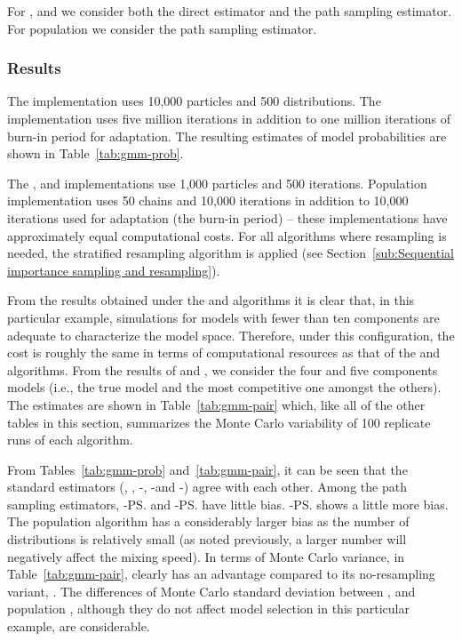 For \smc[2], \smc[3] and \ais we consider both the direct estimator and the path sampling estimator. For population \mcmc we consider the path sampling estimator.

\subsubsection{Results}
\label{sec:gmm_res}

The \smc[1] implementation uses 10,000 particles and 500 distributions. The \rjmcmc implementation uses five million iterations in addition to one million iterations of burn-in period for adaptation. The resulting estimates of model probabilities are shown in Table~\ref{tab:gmm-prob}.

The \smc[2], \smc[3] and \ais implementations use 1,000 particles and 500 iterations. Population \mcmc implementation uses 50 chains and 10,000 iterations in addition to 10,000 iterations used for adaptation (the burn-in period) -- these implementations have approximately equal computational costs. For all algorithms where resampling is needed, the stratified resampling algorithm is applied (see Section~\ref{sub:Sequential importance sampling and resampling}).

From the results obtained under the \smc[1] and \rjmcmc algorithms it is clear that, in this particular example, simulations for models with fewer than ten components are adequate to characterize the model space. Therefore, under this configuration, the cost is roughly the same in terms of computational resources as that of the \smc[1] and \rjmcmc algorithms. From the results of \rjmcmc and \smc[1], we consider the four and five components models (i.e., the true model and the most competitive one amongst the others). The estimates are shown in Table~\ref{tab:gmm-pair} which, like all of the other tables in this section, summarizes the Monte Carlo variability of 100 replicate runs of each algorithm.




From Tables~\ref{tab:gmm-prob} and~\ref{tab:gmm-pair}, it can be seen that the standard estimators (\rjmcmc, \smc[1], \smc[2]-\ds, \smc[3]-\ds and \ais-\ds) agree with each other. Among the path sampling estimators, \smc[2]-\ps and \ais-\ps have little bias. \smc[3]-\ps shows a little more bias. The population \mcmc algorithm has a considerably larger bias as the number of distributions is relatively small (as noted previously, a larger number will negatively affect the mixing speed). In terms of Monte Carlo variance, in Table~\ref{tab:gmm-pair}, \smc[2] clearly has an advantage compared to its no-resampling variant, \ais. The differences of Monte Carlo standard deviation between \smc[2], \smc[3] and population \mcmc, although they do not affect model selection in this particular example, are considerable.

